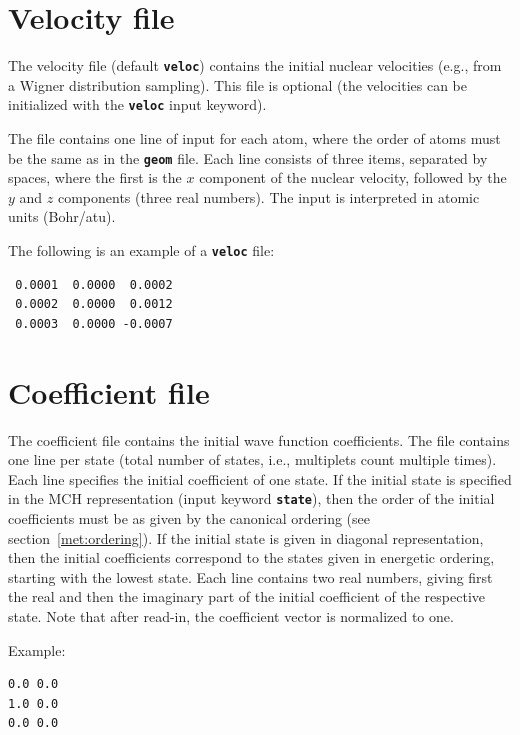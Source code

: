 \documentclass[a4paper,10pt,DIV=15,openany,twoside=false]{scrbook}
\newcommand{\ttt}[1]{\textbf{\texttt{#1}}}
\newenvironment{example}{
  \setlength{\OuterFrameSep}{3pt}
  \vspace{0mm}
  \definecolor{shadecolor}{HTML}{E4F4FF}
  \begin{shaded}
}{
  \end{shaded}
}
\begin{document}
\section{Velocity file}\label{sec:velocfile}

The velocity file (default \ttt{veloc}) contains the initial nuclear velocities (e.g., from a Wigner distribution sampling). This file is optional (the velocities can be initialized with the \ttt{veloc} input keyword). 

The file contains one line of input for each atom, where the order of atoms must be the same as in the \ttt{geom} file. Each line consists of three items, separated by spaces, where the first is the $x$ component of the nuclear velocity, followed by the $y$ and $z$ components (three real numbers). The input is interpreted in atomic units (Bohr/atu).

The following is an example of a \ttt{veloc} file:
\begin{example}
\begin{verbatim}
 0.0001  0.0000  0.0002
 0.0002  0.0000  0.0012
 0.0003  0.0000 -0.0007
\end{verbatim}
\end{example}

\section{Coefficient file}\label{sec:coefffile}

The coefficient file contains the initial wave function coefficients. The file contains one line per state (total number of states, i.e., multiplets count multiple times). Each line specifies the initial coefficient of one state. If the initial state is specified in the MCH representation (input keyword \ttt{state}), then the order of the initial coefficients must be as given by the canonical ordering (see section~\ref{met:ordering}). If the initial state is given in diagonal representation, then the initial coefficients correspond to the states given in energetic ordering, starting with the lowest state.
Each line contains two real numbers, giving first the real and then the imaginary part of the initial coefficient of the respective state.
Note that after read-in, the coefficient vector is normalized to one.

Example:
\begin{example}
  \begin{verbatim}
0.0 0.0
1.0 0.0
0.0 0.0
\end{verbatim}
\end{example}
\end{document}
